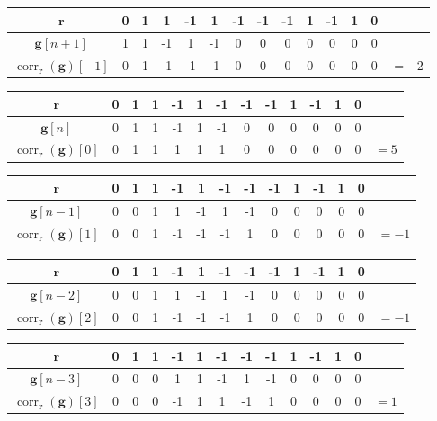 \documentclass[]{article}
\renewcommand{\vec}[1]{\mathbf{#1}}
\newcommand{\corr}{\operatorname{corr}}
\begin{document}
\begin{center}
\begin{tabular}{c|ccccccccccccc}
	\(\vec{r}\) & 0 & 1 & 1 & -1 & 1 & -1 & -1 & -1 & 1 & -1 & 1 & 0 \\
	\hline
	\(\vec{g}[n + 1]\) & 1 & 1 & -1 & 1 & -1 & 0 & 0 & 0 & 0 & 0 & 0 & 0 \\
	\hline
	\(\corr_{\vec{r}}(\vec{g})[-1]\) & 0 & 1 & -1 & -1 & -1 & 0 & 0 & 0 & 0 & 0 & 0 & 0 & \(= -2\) \\
\end{tabular} \vspace{5 mm}
\begin{tabular}{c|ccccccccccccc}
	\(\vec{r}\) & 0 & 1 & 1 & -1 & 1 & -1 & -1 & -1 & 1 & -1 & 1 & 0 \\
	\hline
	\(\vec{g}[n]\) & 0 & 1 & 1 & -1 & 1 & -1 & 0 & 0 & 0 & 0 & 0 & 0 \\
	\hline
	\(\corr_{\vec{r}}(\vec{g})[0]\) & 0 & 1 & 1 & 1 & 1 & 1 & 0 & 0 & 0 & 0 & 0 & 0 & \(= 5\) \\
\end{tabular} \vspace{5 mm}
\begin{tabular}{c|ccccccccccccc}
	\(\vec{r}\) & 0 & 1 & 1 & -1 & 1 & -1 & -1 & -1 & 1 & -1 & 1 & 0 \\
	\hline
	\(\vec{g}[n - 1]\) & 0 & 0 & 1 & 1 & -1 & 1 & -1 & 0 & 0 & 0 & 0 & 0 \\
	\hline
	\(\corr_{\vec{r}}(\vec{g})[1]\) & 0 & 0 & 1 & -1 & -1 & -1 & 1 & 0 & 0 & 0 & 0 & 0 & \(= -1\) \\
\end{tabular} \vspace{5 mm}
\begin{tabular}{c|ccccccccccccc}
	\(\vec{r}\) & 0 & 1 & 1 & -1 & 1 & -1 & -1 & -1 & 1 & -1 & 1 & 0 \\
	\hline
	\(\vec{g}[n - 2]\) & 0 & 0 & 1 & 1 & -1 & 1 & -1 & 0 & 0 & 0 & 0 & 0 \\
	\hline
	\(\corr_{\vec{r}}(\vec{g})[2]\) & 0 & 0 & 1 & -1 & -1 & -1 & 1 & 0 & 0 & 0 & 0 & 0 & \(= -1\) \\
\end{tabular} \vspace{5 mm}
\begin{tabular}{c|ccccccccccccc}
	\(\vec{r}\) & 0 & 1 & 1 & -1 & 1 & -1 & -1 & -1 & 1 & -1 & 1 & 0 \\
	\hline
	\(\vec{g}[n - 3]\) & 0 & 0 & 0 & 1 & 1 & -1 & 1 & -1 & 0 & 0 & 0 & 0 \\
	\hline
	\(\corr_{\vec{r}}(\vec{g})[3]\) & 0 & 0 & 0 & -1 & 1 & 1 & -1 & 1 & 0 & 0 & 0 & 0 & \(= 1\) \\

\end{tabular}
\end{center}
\end{document}

